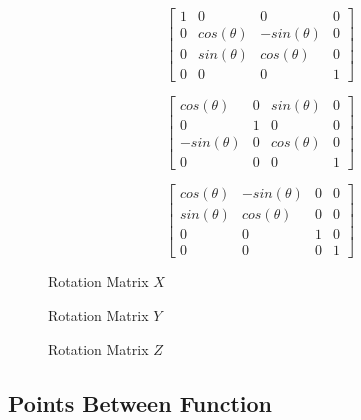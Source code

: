 \documentclass[14pt]{article}
\begin{document}
\begin{figure}[h]
	\begin{center}
		\begin{minipage}[b]{0.3\textwidth}
			\centering
			
			$$
			\begin{bmatrix}
			1 & 0 & 0 & 0\\
			0 & cos(\theta) & -sin(\theta) & 0\\ 
			0 & sin(\theta) & cos(\theta) & 0\\
			0 & 0 & 0 & 1
			\end{bmatrix}
			$$
		\end{minipage}
		\hfill
		\begin{minipage}[b]{0.3\textwidth}
			\centering
			$$
			\begin{bmatrix}
			cos(\theta) & 0 & sin(\theta)& 0 \\
			0 & 1 & 0 & 0 \\
			-sin(\theta) & 0 & cos(\theta) & 0 \\
			0 & 0 & 0 & 1
			\end{bmatrix}			
			$$
		\end{minipage}
		\hfill
		\begin{minipage}[b]{0.3\textwidth}
			\centering
			$$
			\begin{bmatrix}
			cos(\theta) & -sin(\theta) & 0 & 0 \\
			sin(\theta) & cos(\theta) & 0 & 0\\
			0 & 0 & 1 & 0 \\
			0 & 0 & 0 & 1
			\end{bmatrix}			
			$$
		\end{minipage}
	\end{center}
	\begin{center}
		\begin{minipage}[t]{0.3\textwidth}
			\caption*{Rotation Matrix $X$}
		\end{minipage}
		\hfill
		\begin{minipage}[t]{0.3\textwidth}
			\caption*{Rotation Matrix $Y$}
		\end{minipage}
		\hfill
		\begin{minipage}[t]{0.3\textwidth}
			\caption*{Rotation Matrix $Z$}
		\end{minipage}
	\end{center}
\end{figure}

\subsection*{Points Between Function}
\end{document}
